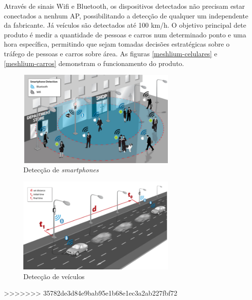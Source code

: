 Através de sinais Wifi e Bluetooth, os dispositivos detectados não precisam estar conectados a nenhum AP, possibilitando a detecção de qualquer um
independente da fabricante. Já veículos são detectados até 100 km/h. O objetivo principal dete produto é medir a quantidade de pessoas e carros
num determinado ponto e uma hora específica, permitindo que sejam tomadas decisões estratégicas sobre o tráfego de pessoas e carros sobre área.
As figuras \autoref{meshlium-celulares} e \autoref{meshlium-carros} demonstram o funcionamento do produto.

\begin{figure}[htb]
	\caption{\label{meshlium-celulares}Detecção de \emph{smartphones}}
	\begin{center}
		\includegraphics[width=0.70\textwidth]{img/meshlium-celulares.png}
	\end{center}
\end{figure}

\begin{figure}[htb]
	\caption{\label{meshlium-carros}Detecção de veículos}
	\begin{center}
		\includegraphics[width=0.70\textwidth]{img/meshlium-carros.png}
	\end{center}
\end{figure}
>>>>>>> 35782de3d84e9bab95e1b68e1ec3a2ab227fbf72
